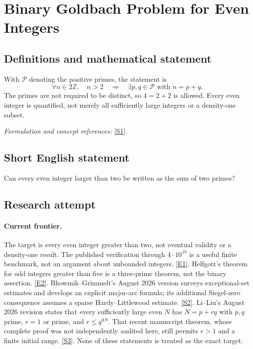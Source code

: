 \documentclass[11pt,a4paper]{article}
\newcommand{\Z}{\mathbb{Z}}
\newcommand{\sref}[2]{\hyperlink{source:#1:#2}{[S#2]}}
\newcommand{\eref}[2]{\hyperlink{extra:#1:#2}{[E#2]}}
\newif\ifshowcatalogue
\newcommand{\cataloguescope}[1]{\ifshowcatalogue
 \paragraph{Exact scope in the supplied catalogue.}
 \begin{quote}\small #1\end{quote}\fi}
\numberwithin{equation}{section}
\begin{document}
\setcounter{section}{24}
\clearpage
\section{\texorpdfstring{Binary Goldbach Problem for Even Integers}{Binary Goldbach Problem for Even Integers}}\label{25}
\subsection{Definitions and mathematical statement}
With $\mathcal P$ denoting the positive primes, the statement is
\[
 \forall n\in2\Z,\quad n>2\quad\Longrightarrow\quad
 \exists p,q\in\mathcal P\text{ with }n=p+q.
\]
The primes are not required to be distinct, so $4=2+2$ is allowed. Every even integer is quantified, not merely all sufficiently large integers or a density-one subset.
\par\smallskip\textit{Formulation and concept references:} \sref{25}{1}.
\cataloguescope{Prove or disprove that every even integer n greater than 2 is the sum of two primes.}
\subsection{Short English statement}
Can every even integer larger than two be written as the sum of two primes?
\subsection{Research attempt}

\paragraph{Current frontier.}
The target is every even integer greater than two, not eventual validity
or a density-one result. The published verification through $4\cdot10^{18}$
is a useful finite benchmark, not an argument about unbounded integers.
\eref{25}{1}. Helfgott's theorem for odd integers greater than five is a
three-prime theorem, not the binary assertion. \eref{25}{2}.
Bhowmik--Grimmelt's August 2026 version surveys exceptional-set estimates
and develops an explicit major-arc formula; its additional Siegel-zero
consequence assumes a sparse Hardy--Littlewood estimate. \sref{25}{2}.
Li--Liu's August 2026 revision states that every sufficiently large even
$N$ has $N=p+rq$ with $p,q$ prime, $r=1$ or prime, and $r\le q^{0.9}$.
That recent manuscript theorem, whose complete proof was not independently
audited here, still permits $r>1$ and a finite initial range.
\sref{25}{3}. None of these statements is treated as the exact target.
\end{document}
